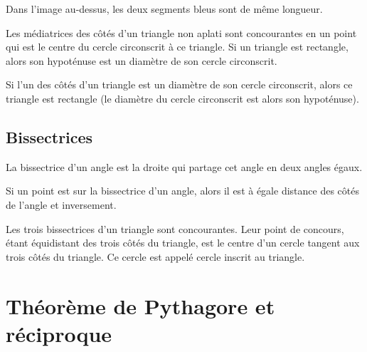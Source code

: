 \begin{exemple}
    Dans l'image au-dessus, les deux segments bleus sont de même longueur.
\end{exemple}

\begin{propriete}
    Les médiatrices des côtés d'un triangle non aplati sont concourantes en un point qui est le centre du cercle circonscrit à ce triangle. Si un triangle est rectangle, alors son hypoténuse est un diamètre de son cercle circonscrit.
\end{propriete}

\begin{propriete}
    Si l'un des côtés d'un triangle est un diamètre de son cercle circonscrit, alors ce triangle est rectangle (le diamètre du cercle circonscrit est alors son hypoténuse).
\end{propriete}

\subsection{Bissectrices}

\begin{definitionfr}
    La bissectrice d'un angle est la droite qui partage cet angle en deux angles égaux.
\end{definitionfr}

\begin{center}
\end{center}

\begin{propriete}
    Si un point est sur la bissectrice d'un angle, alors il est à égale distance des côtés de l'angle et inversement.
\end{propriete}

\begin{propriete}
    Les trois bissectrices d'un triangle sont concourantes. Leur point de concours, étant équidistant des trois côtés du triangle, est le centre d'un cercle tangent aux trois côtés du triangle. Ce cercle est appelé cercle inscrit au triangle.
\end{propriete}


\section{Théorème de Pythagore et réciproque}

